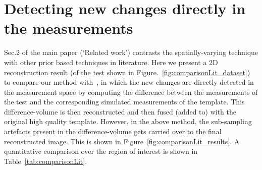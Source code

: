 \documentclass{article}
\begin{document}
\section{Detecting new changes directly in the measurements}

Sec.2 of the main paper (`Related work') contrasts the spatially-varying technique  with other prior based techniques in literature. Here we present a 2D reconstruction  result (of the test shown in Figure.~\ref{fig:comparisonLit_dataset}) to compare our method with~\cite{Lee2012}, in which the new changes are directly detected in the measurement space by computing the difference between the measurements of the test and the corresponding simulated measurements of the template. This difference-volume is then reconstructed and then fused (added to) with the original high quality template. However, in the above method, the sub-sampling artefacts present in the difference-volume gets carried over to the final reconstructed image. This is shown in Figure~\ref{fig:comparisonLit_results}. A quantitative comparison over the region of interest is shown in Table~\ref{tab:comparisonLit}.
\end{document}
